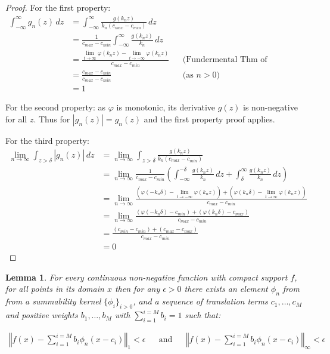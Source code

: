 \documentclass{article} %
\newtheorem{lem}[thm]{Lemma}
\newcommand{\dlim}{\displaystyle\lim}
\begin{document}
\begin{proof}
For the first property:
\begin{align}
	\int_{-\infty}^{\infty} g_n(z) \, dz &=  \int_{-\infty}^{\infty} \frac{g(k_nz)}{k_n\left( c_{max} - c_{min} \right)} \, dz \\
	&= \frac{1}{c_{max} - c_{min}} \int_{-\infty}^{\infty} \frac{g(k_n z)}{k_n} \, dz \\
	&= \frac{\dlim_{t \to \infty} \varphi(k_n z) - \dlim_{t \to -\infty} \varphi(k_n z)}{c_{max} - c_{min}} && \text{(Fundermental Thm of Calculus)}\\
	&= \frac{c_{max} - c_{min}}{c_{max} - c_{min}}  && \text{(as $n>0$)}\\
	&= 1	
\end{align}
	
For the second property: as  $\varphi$ is monotonic, its derivative $g(z)$ is non-negative for all $z$. Thus for $|g_n(z)|=g_n(z)$ and the first property proof applies.

For the third property:
\begin{align}
	\lim_{n\to\infty} \int_{z>\delta} |g_n(z)|\, dz 
	 &= \lim_{n\to\infty} \int_{z>\delta} \frac{g(k_n z)}{k_n\left( c_{max} - c_{min} \right)} \\
	 &= \lim_{n\to\infty} \frac{1}{c_{max} - c_{min}} 
		 \left( \int_{-\infty}^{-\delta} \frac{g(k_n z)}{k_n} \, dz 
		 + \int_\delta^\infty \frac{g(k_n z)}{k_n} \, dz \right) \\
	 &= \lim_{n\to\infty} \frac{
	 	\left(\varphi(-k_n\delta)-\dlim_{t \to -\infty} \varphi(k_n z)\right)
	 	 + \left( \varphi(k_n\delta) - \dlim_{t \to \infty} \varphi(k_n z)\right)}%
	 	 {c_{max} - c_{min}} \\
	 &= \lim_{n\to\infty} \frac{
	 	\left(\varphi(-k_n\delta)-c_{min} \right)
	 	+ \left( \varphi(k_n\delta) - c_{max} \right)}%
	    {c_{max} - c_{min}} \\
	 &= \frac{
	 	\left(c_{min}-c_{min} \right)
	 	+ \left(c_{max} - c_{max} \right)}%
		{c_{max} - c_{min}} \\
	 &= 0
\end{align}

\end{proof}

\begin{lem}\label{lem:approxwithsummability}
For every continuous non-negative function with compact support $f$,
for all points in its domain $x$
then for any $\epsilon >0$ there exists an element $\phi_n$ from from a summability kernel $\lbrace \phi_i  \rbrace_{i>0}$, and a sequence of translation terms $c_1,\ldots,c_M$ and positive weights $b_1,\ldots,b_M$ with $\sum_{i=1}^{i=M} b_i = 1$ such that:


\begin{align}
\left\Vert f(x)-\sum_{i=1}^{i=M}b_{i}\phi_{n}(x-c_i)\right\Vert _{1}<\epsilon &&
 \text{and} &&
\left\Vert f(x)-\sum_{i=1}^{i=M}b_{i}\phi_{n}(x-c_i)\right\Vert _{\infty}<\epsilon
\end{align}

\end{lem}
\end{document}
